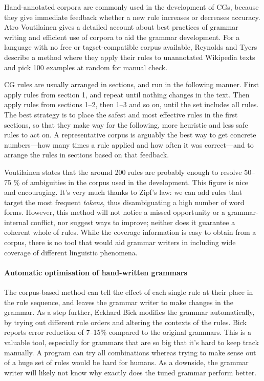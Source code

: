 Hand-annotated corpora are commonly used in the development of CGs, because they give immediate feedback whether a new rule increases or decreases accuracy.
Atro Voutilainen \cite{voutilainen2004} gives a detailed account about best practices of grammar writing and efficient use of corpora to aid the grammar development.
For a language with no free or tagset-compatible corpus available, Reynolds and Tyers \cite{tyers_reynolds2015} describe a method where they apply their rules to unannotated Wikipedia texts and pick 100 examples at random for manual check.

CG rules are usually arranged in sections, and run in the following manner. 
First apply rules from section 1, and repeat until nothing changes in the text. Then apply rules from sections 1--2, then 1--3 and so on, until the set includes all rules.
The best strategy is to place the safest and most effective rules in the first sections,
so that they make way for the following, more heuristic and less safe rules to act on.
A representative corpus is arguably the best way to get concrete numbers---how many times a rule applied and how often it was correct---and to arrange the rules in sections based on that feedback.

Voutilainen \cite{voutilainen2004} states that the around 200 rules are probably enough to resolve 50--75 \% of ambiguities in the corpus used in the development. 
This figure is nice and encouraging. It's very much thanks to Zipf's law: we can add rules that target the most frequent \emph{tokens}, thus disambiguating a high number of word forms.
However, this method will not notice a missed opportunity or a grammar-internal conflict, nor suggest ways to improve; neither does it guarantee a coherent whole of rules. 
While the coverage information is easy to obtain from a corpus, there is no tool that would aid grammar writers in including wide coverage of different linguistic phenomena.




\paragraph{Automatic optimisation of hand-written grammars }

The corpus-based method can tell the effect of each single rule at their place in the rule sequence, and leaves the grammar writer to make changes in the grammar.
As a step further, Eckhard Bick \cite{bick2013tuning} modifies the grammar automatically, by trying
out different rule orders and altering the contexts of the rules. 
Bick reports error reduction of 7--15\% compared to the original grammars.
This is a valuable tool, especially for grammars that are so big that it's hard to keep track manually. A program can try all combinations whereas trying to make sense out of a huge set of rules would be hard for humans.
As a downside, the grammar writer will likely not know why exactly does the tuned grammar perform better.


